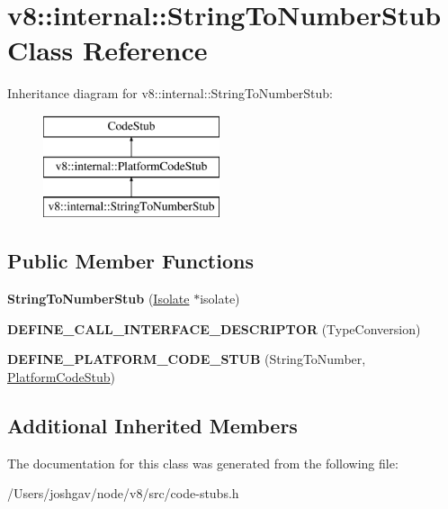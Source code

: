 \hypertarget{classv8_1_1internal_1_1_string_to_number_stub}{}\section{v8\+:\+:internal\+:\+:String\+To\+Number\+Stub Class Reference}
\label{classv8_1_1internal_1_1_string_to_number_stub}
Inheritance diagram for v8\+:\+:internal\+:\+:String\+To\+Number\+Stub\+:\begin{figure}[H]
\begin{center}
\leavevmode
\includegraphics[height=3.000000cm]{classv8_1_1internal_1_1_string_to_number_stub}
\end{center}
\end{figure}
\subsection*{Public Member Functions}
\begin{DoxyCompactItemize}
\item 
{\bfseries String\+To\+Number\+Stub} (\hyperlink{classv8_1_1internal_1_1_isolate}{Isolate} $\ast$isolate)\hypertarget{classv8_1_1internal_1_1_string_to_number_stub_afed4ab9d5984cc139d0151288d34d9c7}{}\label{classv8_1_1internal_1_1_string_to_number_stub_afed4ab9d5984cc139d0151288d34d9c7}

\item 
{\bfseries D\+E\+F\+I\+N\+E\+\_\+\+C\+A\+L\+L\+\_\+\+I\+N\+T\+E\+R\+F\+A\+C\+E\+\_\+\+D\+E\+S\+C\+R\+I\+P\+T\+OR} (Type\+Conversion)\hypertarget{classv8_1_1internal_1_1_string_to_number_stub_ac9d34e914245db1ab8f5051853cc6ac7}{}\label{classv8_1_1internal_1_1_string_to_number_stub_ac9d34e914245db1ab8f5051853cc6ac7}

\item 
{\bfseries D\+E\+F\+I\+N\+E\+\_\+\+P\+L\+A\+T\+F\+O\+R\+M\+\_\+\+C\+O\+D\+E\+\_\+\+S\+T\+UB} (String\+To\+Number, \hyperlink{classv8_1_1internal_1_1_platform_code_stub}{Platform\+Code\+Stub})\hypertarget{classv8_1_1internal_1_1_string_to_number_stub_a0145d2d03fa5a3d7f5b8c2c425e35c8e}{}\label{classv8_1_1internal_1_1_string_to_number_stub_a0145d2d03fa5a3d7f5b8c2c425e35c8e}

\end{DoxyCompactItemize}
\subsection*{Additional Inherited Members}


The documentation for this class was generated from the following file\+:\begin{DoxyCompactItemize}
\item 
/\+Users/joshgav/node/v8/src/code-\/stubs.\+h\end{DoxyCompactItemize}
